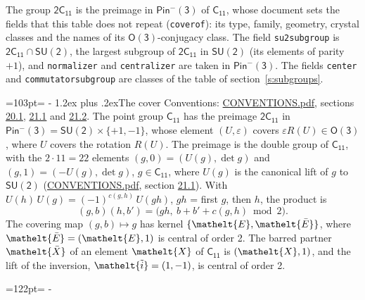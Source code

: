 \documentclass[10pt,a4paper]{article}
\makeatletter
\renewcommand\section{\@startsection{section}{1}{\z@}{-3ex plus -1ex minus -.2ex}%
  {1.2ex plus .2ex}{\normalfont\large\sffamily\bfseries\color{parttitle}}}
\newcommand{\needspace}[1]{\par\penalty-100\begingroup\dimen0=#1\relax\dimen2=\pagegoal
  \advance\dimen2-\pagetotal\ifdim\dimen0>\dimen2\relax\ifdim\dimen2>0pt\vfil\break\fi\fi
  \endgroup}
\numberwithin{equation}{section}
\newcommand{\eltfont}[1]{{\let\sigma\eltsigma\mathelt{#1}}}
\newcommand{\grp}[1]{\mathsf{#1}}
\newcommand{\elt}[1]{\eltfont{#1}}
\newcommand{\dirprod}{\times}
\newcommand{\barred}[1]{\bar{#1}}
\newcommand{\lift}[1]{\tilde{#1}}
\makeatother
\begin{document}
\leavevmode\label{n:element.inversion}\label{n:group.preimage}The group $\grp{2C_{11}}$ is the preimage in $\grp{Pin^{-}(3)}$ of \href{../../../rotation/data/pdf/C11.pdf}{$\grp{C_{11}}$}, whose document sets the fields that this table does not repeat (\texttt{coverof}): its type, family, geometry, crystal classes and the names of its \href{../../../rotation/data/pdf/O3.pdf}{$\grp{O(3)}$}-conjugacy class. The field \texttt{su2subgroup} is $\grp{2C_{11}} \cap \grp{SU(2)}$, the largest subgroup of $\grp{2C_{11}}$ in $\grp{SU(2)}$ (its elements of parity $+1$), and \texttt{normalizer} and \texttt{centralizer} are taken in $\grp{Pin^{-}(3)}$. The fields \texttt{center} and \texttt{commutatorsubgroup} are classes of the table of section~\ref{s:subgroups}.
\needspace{103pt}
\section{The cover}\label{s:cover}
Conventions: \href{../../CONVENTIONS.pdf}{CONVENTIONS.pdf}, sections \href{../../CONVENTIONS.pdf\#conv.20.1}{20.1}, \href{../../CONVENTIONS.pdf\#conv.21.1}{21.1} and \href{../../CONVENTIONS.pdf\#conv.21.2}{21.2}.
\leavevmode\label{n:group.pin.minus}\label{n:group.su2}\label{n:local.pin.sign}\label{n:matrix.covered}\label{n:matrix.lift.su2}\label{n:index.bar}The point group $\grp{C_{11}}$ has the preimage $\grp{2C_{11}}$ in $\grp{Pin^{-}(3)} = \grp{SU(2)} \dirprod \{+1, -1\}$, whose element $(U, \varepsilon)$ covers $\varepsilon R(U) \in \grp{O(3)}$, where $U$ covers the rotation $R(U)$. The preimage is the double group of $\grp{C_{11}}$, with the $2 \cdot 11 = 22$ elements $(g, 0) = (U(g), \det g)$ and $(g, 1) = (-U(g), \det g)$, $g \in \grp{C_{11}}$, where $U(g)$ is the canonical lift of $g$ to $\grp{SU(2)}$ (\href{../../CONVENTIONS.pdf}{CONVENTIONS.pdf}, section \href{../../CONVENTIONS.pdf\#conv.21.1}{21.1}). \label{n:function.cocycle}With $U(h)\,U(g) = (-1)^{c(g,h)}\,U(gh)$, $gh$ = first $g$, then $h$, the product is
\begin{equation}\label{e:product}(g, b)(h, b') = \bigl(gh,\ b + b' + c(g, h) \bmod 2\bigr).\end{equation}
\leavevmode\label{n:mark.bar}The covering map $(g, b) \mapsto g$ has kernel $\{\elt{E}, \elt{\barred{E}}\}$, where $\elt{\barred{E}} = (\elt{E}, 1)$ is central of order 2. \label{n:element.named}\label{n:mark.lift}The barred partner $\elt{\barred{X}}$ of an element $\elt{X}$ of $\grp{C_{11}}$ is $(\elt{X}, 1)$, and the lift of the inversion, $\elt{\lift{i}} = (1, -1)$, is central of order 2.
\needspace{122pt}
\end{document}

